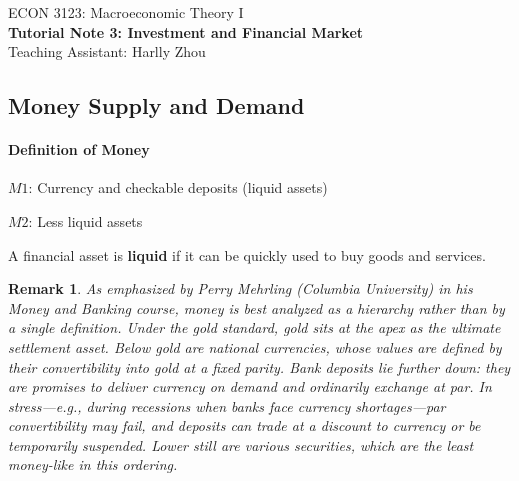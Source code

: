 \documentclass[12pt]{article}
\newtheorem*{remark}{Remark}
\begin{document}
\begin{center}
    ECON 3123: Macroeconomic Theory I\\
    {\large \textbf{Tutorial Note 3: Investment and Financial Market}}\\
    Teaching Assistant: Harlly Zhou
\end{center}

\subsection*{Money Supply and Demand}
\paragraph{Definition of Money}
$M1$: Currency and checkable deposits (liquid assets)

$M2$: Less liquid assets

A financial asset is \textbf{liquid} if it can be quickly used to buy goods and services.

\begin{remark}
	As emphasized by Perry Mehrling (Columbia University) in his Money and Banking course, money is best analyzed as a \emph{hierarchy} rather than by a single definition. Under the gold standard, gold sits at the apex as the ultimate settlement asset. Below gold are national currencies, whose values are defined by their convertibility into gold at a fixed parity. Bank deposits lie further down: they are promises to deliver currency on demand and ordinarily exchange at par. In stress—e.g., during recessions when banks face currency shortages—par convertibility may fail, and deposits can trade at a discount to currency or be temporarily suspended. Lower still are various securities, which are the least money-like in this ordering.
\end{remark}
\end{document}
